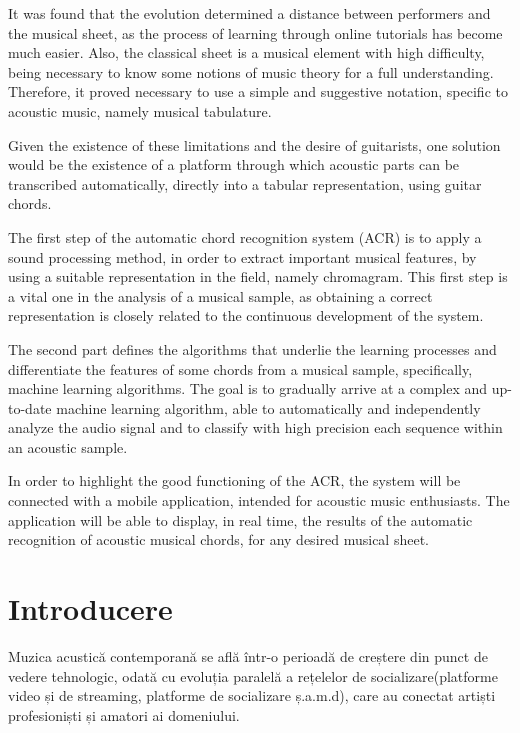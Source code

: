 \documentclass[a4paper,12pt]{report}
\begin{document}
It was found that the evolution determined a distance between
performers and the musical sheet, as the process of learning through 
online tutorials has become much easier. 
Also, the classical sheet is a musical element with high difficulty, 
being necessary to know some notions of music theory for a full understanding.
Therefore, it proved necessary to use a simple and suggestive notation, 
specific to acoustic music, namely musical tabulature.

Given the existence of these limitations and the desire of guitarists, 
one solution would be the existence of a platform through which acoustic 
parts can be transcribed automatically, directly into a tabular representation,
using guitar chords. 

The first step of the automatic chord recognition system (ACR) is to 
apply a sound processing method, in order to extract important musical 
features, by using a suitable representation in the field, namely chromagram.
This first step is a vital one in the analysis of a musical sample, 
as obtaining a correct representation is closely related to 
the continuous development of the system. 

The second part defines the algorithms that 
underlie the learning processes and differentiate the 
features of some chords from a musical sample, specifically, 
machine learning algorithms. The goal is to gradually arrive at a complex 
and up-to-date machine learning algorithm, able to automatically and independently 
analyze the audio signal and to classify with high 
precision each sequence within an acoustic sample.

In order to highlight the good functioning of the ACR, 
the system will be connected with a mobile application, 
intended for acoustic music enthusiasts. The application will be able to display, 
in real time, the results of the automatic recognition of acoustic musical chords, 
for any desired musical sheet.

\newpage

\newpage
\renewcommand{\contentsname}{Cuprins}
\tableofcontents
\chapter{Introducere}
Muzica acustică contemporană se află într-o perioadă de creștere din punct de vedere 
tehnologic, odată cu evoluția paralelă a rețelelor de socializare(platforme 
video și de streaming, platforme de socializare ș.a.m.d), care au conectat
artiști profesioniști și amatori ai domeniului.
\end{document}

